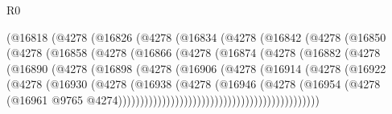 \begin{lexlean}{R0}
\begin{coremodule}
                      (@16818
                        (@4278
                          (@16826
                            (@4278
                              (@16834
                                (@4278
                                  (@16842
                                    (@4278
                                      (@16850
                                        (@4278
                                          (@16858
                                            (@4278
                                              (@16866
                                                (@4278
                                                  (@16874
                                                    (@4278
                                                      (@16882
                                                        (@4278
                                                          (@16890
                                                            (@4278
                                                              (@16898
                                                                (@4278
                                                                  (@16906
                                                                    (@4278
                                                                      (@16914
                                                                        (@4278
                                                                          (@16922
                                                                            (@4278
                                                                              (@16930
                                                                                (@4278
                                                                                  (@16938
                                                                                    (@4278
                                                                                      (@16946
                                                                                        (@4278
                                                                                          (@16954
                                                                                            (@4278
                                                                                              (@16961
                                                                                                @9765
                                                                                                @4274))))))))))))))))))))))))))))))))))))))))))))))

\end{coremodule}
\end{lexlean}
